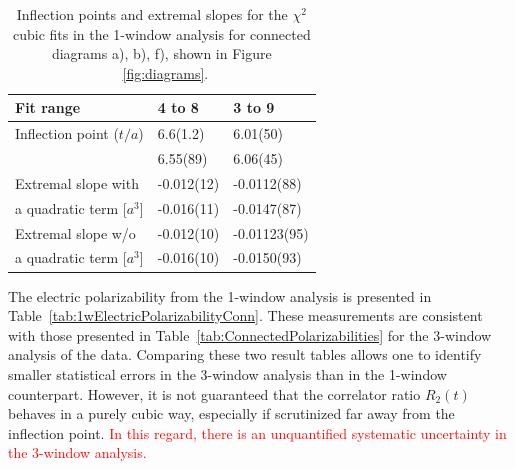\begin{table}[H]
\begin{center}
    \begin{tabular}{|l|l|l|}
    \hline
     Fit range   & 4 to 8   & 3 to 9  \\ \hline
     Inflection point ($t/a$) 		& 6.6(1.2)       	& 6.01(50)      \\ 
     						& 6.55(89) 	& 6.06(45)	\\ \hline
     Extremal slope with   		& -0.012(12)     & -0.0112(88)          \\ 
     a quadratic term [$a^3$]	& -0.016(11)	& -0.0147(87)	\\ \hline
     Extremal slope w/o   		& -0.012(10)     & -0.01123(95)   \\ 
     a quadratic term [$a^3$]	& -0.016(10)	& -0.0150(93)	\\ \hline
    \end{tabular}
\end{center}
\caption{Inflection points and extremal slopes for the $\chi^2$ cubic fits in the 1-window analysis for connected diagrams a), b), f), shown in Figure ~\ref{fig:diagrams}. }
\label{tab:1walphaconnected}
\end{table}
 

The  electric polarizability from the 1-window
analysis is presented in Table~\ref{tab:1wElectricPolarizabilityConn}. 
These measurements are consistent with those presented in 
Table~\ref{tab:ConnectedPolarizabilities} for the 3-window analysis of the data.
Comparing these two result tables allows one to
identify smaller statistical errors in the 3-window analysis than in 
the 1-window counterpart. However, it is not guaranteed that the
correlator ratio $R_2(t)$ behaves in a purely cubic way, 
especially if scrutinized far away from the inflection point. \textcolor{red}
{In this regard, there is an unquantified systematic uncertainty in the 3-window analysis.}

